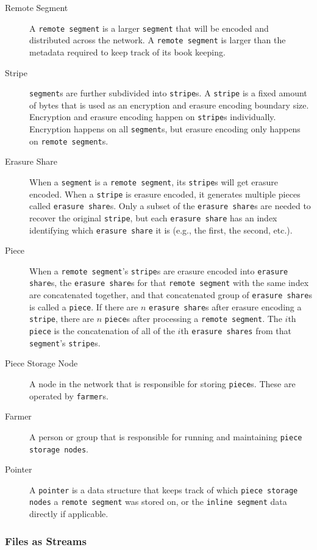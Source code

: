 \documentclass[a4paper,10pt]{article}
\newcommand{\x}[1]{{\tt #1}}
\begin{document}
\begin{description}
\item[Remote Segment] A \x{remote segment} is a larger \x{segment} that will be
encoded and distributed across the network. A \x{remote segment} is larger than
the metadata required to keep track of its book keeping.

\item[Stripe] \x{segment}s are further subdivided into \x{stripe}s. A \x{stripe}
is a fixed amount of bytes that is used as an encryption and erasure encoding
boundary size. Encryption and erasure encoding happen on \x{stripe}s
individually. Encryption happens on all \x{segment}s, but erasure encoding only
happens on \x{remote segment}s.

\item[Erasure Share] When a \x{segment} is a \x{remote segment}, its \x{stripe}s
will get erasure encoded. When a \x{stripe} is erasure encoded, it generates
multiple pieces called \x{erasure share}s. Only a subset of the
\x{erasure share}s are needed to recover the original \x{stripe}, but each
\x{erasure share} has an index identifying which \x{erasure share} it is (e.g.,
the first, the second, etc.).

\item[Piece] When a \x{remote segment}'s \x{stripe}s are erasure encoded into
\x{erasure share}s, the \x{erasure share}s for that \x{remote segment} with the
same index are concatenated together, and that concatenated group of
\x{erasure share}s is called a \x{piece}. If there are $n$ \x{erasure share}s
after erasure encoding a \x{stripe}, there are $n$ \x{piece}s after processing
a \x{remote segment}. The $i$th \x{piece} is the concatenation of all of the
$i$th \x{erasure shares} from that \x{segment}'s \x{stripe}s.

\item[Piece Storage Node] A node in the network that is responsible for storing
\x{piece}s. These are operated by \x{farmer}s.

\item[Farmer] A person or group that is responsible for running and maintaining
\x{piece storage nodes}.

\item[Pointer] A \x{pointer} is a data structure that keeps track of which
\x{piece storage nodes} a \x{remote segment} was stored on, or the
\x{inline segment} data directly if applicable.

\end{description}

\subsubsection{Files as Streams}
\end{document}
